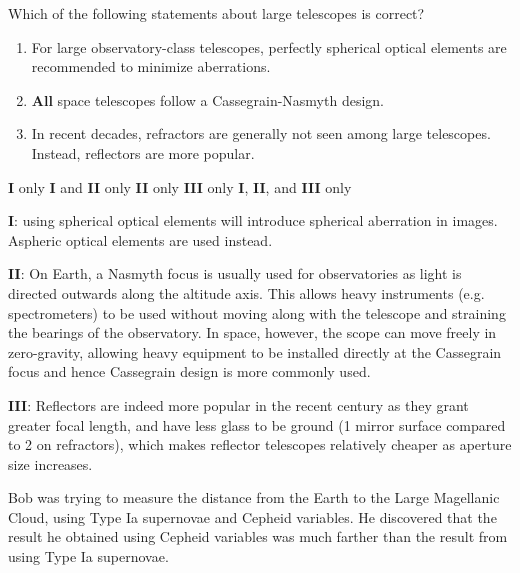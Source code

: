 \documentclass[a4paper,11pt]{exam}
\begin{document}
\begin{questions}
\filbreak
\question
	Which of the following statements about large telescopes is correct?
	\begin{enumerate}[align=left,labelsep=0pt,leftmargin=0pt,labelsep=3pt,itemindent=23pt,parsep=6pt,label=\textbf{\Roman{*}}.]
		\item For large observatory-class telescopes, perfectly spherical optical elements are recommended to \hspace*{20pt} minimize aberrations.
		\item \textbf{All} space telescopes follow a Cassegrain-Nasmyth design.
		\item In recent decades, refractors are generally not seen among large telescopes. Instead, reflectors are \hspace*{20pt} more popular.
	\end{enumerate}

	\begin{oneparchoices}
		\choice \textbf{I} only
		\choice \textbf{I} and \textbf{II} only
		\choice \textbf{II} only
		\correctchoice \textbf{III} only
		\choice \textbf{I}, \textbf{II}, and \textbf{III} only
	\end{oneparchoices}
	\begin{solution}
		\textbf{I}: using spherical optical elements will introduce spherical aberration in images. Aspheric optical elements are used instead.

		\textbf{II}: On Earth, a Nasmyth focus is usually used for observatories as light is directed outwards along the altitude axis. This allows heavy instruments (e.g. spectrometers) to be used without moving along with the telescope and straining the bearings of the observatory. In space, however, the scope can move freely in zero-gravity, allowing heavy equipment to be installed directly at the Cassegrain focus and hence Cassegrain design is more commonly used.

		\textbf{III}: Reflectors are indeed more popular in the recent century as they grant greater focal length, and have less glass to be ground (1 mirror surface compared to 2 on refractors), which makes reflector telescopes relatively cheaper as aperture size increases.
	\end{solution}

\filbreak
\question
	Bob was trying to measure the distance from the Earth to the Large Magellanic Cloud, using Type Ia supernovae and Cepheid variables. He discovered that the result he obtained using Cepheid variables was much farther than the result from using Type Ia supernovae.


\end{questions}
\end{document}
